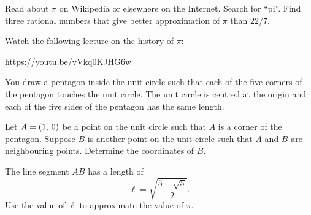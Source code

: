 \documentclass[a4paper,oneside,12pt]{article}
\begin{document}
\begin{problem}
\item Read about $\pi$ on Wikipedia or elsewhere on the Internet.
  Search for ``pi''.  Find three rational numbers that give better
  approximation of $\pi$ than $22 / 7$.

\item Watch the following lecture on the history of $\pi$:
  \begin{center}
  \url{https://youtu.be/vVkq0KJHG6w}
  \end{center}

\item You draw a pentagon inside the unit circle such that each of the
  five corners of the pentagon touches the unit circle.  The unit
  circle is centred at the origin and each of the five sides of the
  pentagon has the same length.
  \begin{packedenum}
  \item\label{subprob:inscribed_pentagon_B_coordinates}
    Let $A = \left\lparen{1},\, {0}\right\rparen$ be a point on the unit circle such that $A$
    is a corner of the pentagon.  Suppose $B$ is another point on the
    unit circle such that $A$ and $B$ are neighbouring points.
    Determine the coordinates of $B$.

  \item\label{subprob:inscribed_pentagon_approximate_pi}
    The line segment $AB$ has a length of
    \[
    \ell
    =
    \sqrt{
      \frac{5 - \sqrt{5}}{2}
    }.
    \]
    Use the value of $\ell$ to approximate the value of $\pi$.
  \end{packedenum}


\end{problem}
\end{document}
